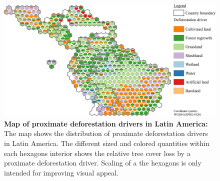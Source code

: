 			\begin{figure}[ht]
				\centering
				\includegraphics[scale=1]{img/americas_driver_frameless}
				\caption[Map of proximate deforestation drivers in Latin America]{\textbf{Map of proximate deforestation drivers in Latin America:} The map shows the distribution of proximate deforestation drivers in Latin America. The different sized and colored quantities within each hexagons interior shows the relative tree cover loss by a proximate deforestation driver. Scaling of a the hexagons is only intended for improving visual appeal.}
				\label{fig:americas_driver}
			\end{figure}

